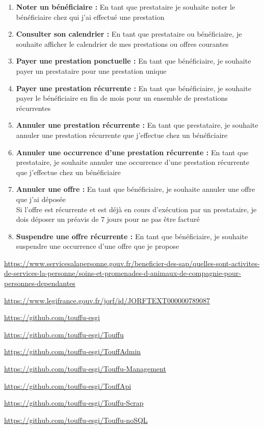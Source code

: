 \documentclass[conference]{IEEEtran}
\begin{document}
\begin{enumerate}
	\item \textbf{Noter un bénéficiaire :} En tant que prestataire je souhaite noter le bénéficiaire chez qui j'ai effectué une prestation
	\item \textbf{Consulter son calendrier :} En tant que prestataire ou bénéficiaire, je souhaite afficher le calendrier de mes prestations ou offres courantes
	\item \textbf{Payer une prestation ponctuelle :} En tant que bénéficiaire, je souhaite payer un prestataire pour une prestation unique
	\item \textbf{Payer une prestation récurrente :} En tant que bénéficiaire, je souhaite payer le bénéficiaire en fin de mois pour un ensemble de prestations récurrentes
	\item \textbf{Annuler une prestation récurrente :} En tant que prestataire, je souhaite annuler une prestation récurrente que j'effectue chez un bénéficiaire
	\item \textbf{Annuler une occurrence d'une prestation récurrente :} En tant que prestataire, je souhaite annuler une occurrence d'une prestation récurrente que j'effectue chez un bénéficiaire
	\item \textbf{Annuler une offre :} En tant que bénéficiaire, je souhaite annuler une offre que j'ai déposée
	\\Si l'offre est récurrente et est déjà en cours d'exécution par un prestataire, je dois déposer un préavis de 7 jours pour ne pas être facturé
	\item \textbf{Suspendre une offre récurrente :} En tant que bénéficiaire, je souhaite suspendre une occurrence d'une offre que je propose
\end{enumerate}





\begin{thebibliography}{00}

\url{https://www.servicesalapersonne.gouv.fr/beneficier-des-sap/quelles-sont-activites-de-services-la-personne/soins-et-promenades-d-animaux-de-compagnie-pour-personnes-dependantes}

\url{https://www.legifrance.gouv.fr/jorf/id/JORFTEXT000000789087
}

\url{https://github.com/touffu-esgi}

\url{https://github.com/touffu-esgi/Touffu}

\url{https://github.com/touffu-esgi/TouffAdmin}

\url{https://github.com/touffu-esgi/Touffu-Management}

\url{https://github.com/touffu-esgi/TouffApi}

\url{https://github.com/touffu-esgi/Touffu-Scrap}

\url{https://github.com/touffu-esgi/Touffu-noSQL}

\end{thebibliography}
\end{document}
